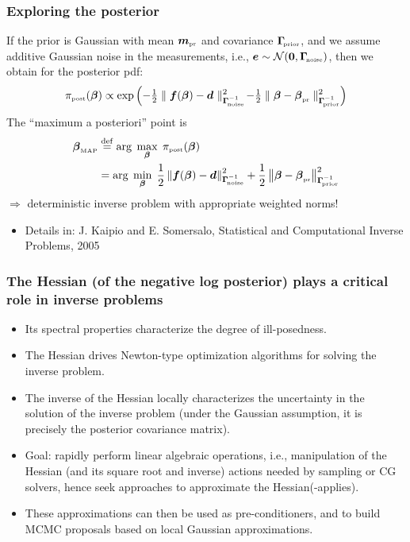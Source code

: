 \documentclass[10pt,final,xcolor=dvipsnames]{beamer}
\renewcommand{\vec}[1]{{\mathchoice
                     {\mbox{\boldmath$\displaystyle{#1}$}}
                     {\mbox{\boldmath$\textstyle{#1}$}}
                     {\mbox{\boldmath$\scriptstyle{#1}$}}
                     {\mbox{\boldmath$\scriptscriptstyle{#1}$}}}}
\newcommand{\bdm} {\begin{displaymath}}
\newcommand{\edm} {\end{displaymath}}
\newcommand{\dobs}{{\vec{d}}}
\newcommand{\post}{\pi_{\mbox{\tiny post}}}
\newcommand{\ncov} {\bs{\Gamma}_{\!\mbox{\tiny noise}} }
\newcommand{\prcov} {\bs{\Gamma}_{\!\mbox{\tiny prior}} }
\newcommand{\mpr} {{\vec{m}}_{\mbox{\tiny pr}} }
\newcommand{\gbf}[1]{\boldsymbol{#1}}
\newcommand{\bs}[1]{\ensuremath{\boldsymbol{#1}}}
\renewcommand{\vec}[1]{\gbf{#1}}
\begin{document}
\begin{frame}
  \frametitle{Exploring the posterior}

  If the prior is Gaussian with mean $\mpr$ and covariance $\prcov$,
  and we assume additive Gaussian noise in the measurements, i.e.,
  $\bs{e} \sim \mathcal{N}(\bs{0}, \ncov )$, then we obtain for the
  posterior pdf:
  \bdm
  \post(\bs{\beta})  \propto
  \exp \left( - \tfrac{1}{2} \parallel \bs{f}(\bs{\beta}) -
  \bs{d}_{\mbox{\tiny}}
  \parallel^{2}_{\ncov^{-1}} \!
  - \tfrac{1}{2}\parallel \bs{\beta} - \bs{\beta}_{\mbox{\tiny pr}}
  \parallel^{2}_{\prcov^{-1}}
  \right)
  \edm
  \vspace{0.2cm}
  The ``maximum a posteriori'' point is
  \begin{alignat*}{2}
    \bs{\beta}_{\mbox{\tiny MAP}}& \stackrel{\mathrm{def}}{=} \arg \;
    \max_{\bs \beta} \; \pi_{\mbox{\tiny post}}(\bs{\beta})
    \\
    &= \arg \;
    \min_{\bs \beta} \; \frac{1}{2} \left\|  \bs{f}(\bs{\beta}) -\dobs
    \right\|^2_{\ncov^{-1}}
    + \frac{1}{2} \left\|{\bs{\beta} - \bs{\beta}_{\mbox{\tiny pr}}}\right\|^2_{\prcov^{-1}}
  \end{alignat*}
  $\Rightarrow$ deterministic inverse problem with appropriate weighted norms!
  \vspace{1cm}
  \begin{itemize}
  \item [] \scriptsize{Details in: J. Kaipio and E. Somersalo, Statistical and Computational Inverse Problems, 2005}
  \end{itemize}
\end{frame}
\begin{frame}
  \frametitle{The Hessian (of the negative log posterior) plays a
    critical role in inverse problems}
  \begin{itemize}
  \item Its spectral properties characterize the degree of
    ill-posedness.
  \item The Hessian drives Newton-type optimization algorithms for
    solving the inverse problem.
  \item The inverse of the Hessian locally characterizes the uncertainty
    in the solution of the inverse problem (under the Gaussian
    assumption, it is precisely the posterior covariance matrix).
  \item \alert{Goal:} rapidly perform linear algebraic operations, i.e.,
    manipulation of the Hessian (and its square root and inverse)
    actions needed by sampling or CG solvers, hence \alert{seek
      approaches to approximate the Hessian(-applies)}.
  \item These approximations can then be used as
    \alert{pre-conditioners}, and to \alert{build MCMC proposals} based
    on local Gaussian approximations.
  \end{itemize}
\end{frame}
\end{document}
